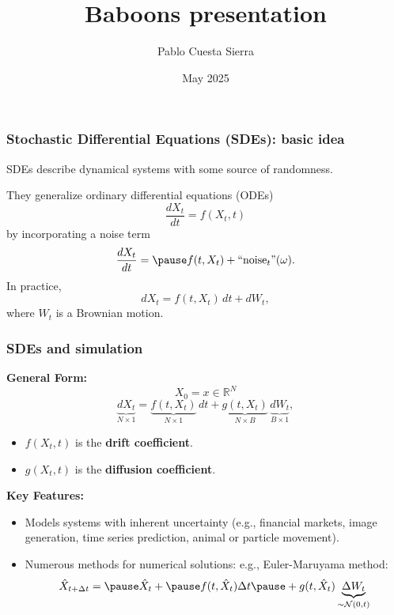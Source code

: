 \documentclass[
    aspectratio=169,
    10pt,
]{beamer}
\title{Baboons presentation}
\author{Pablo Cuesta Sierra}
\date{May 2025}
\begin{document}
\begin{frame}
\frametitle{Stochastic Differential Equations (SDEs): basic idea}


       SDEs describe dynamical systems with some source of randomness. \pause

       They generalize ordinary differential equations (ODEs)
        \[
           \frac{dX_t}{dt} = f(X_t, t)
        \]
        by incorporating a noise term 
        \[
           \frac{dX_t}{dt} = \pause f(t, X_t) + \text{``noise}_t\text{''}(\omega).
        \]
    \pause
        In practice,\[
            dX_t = f(t, X_t)\, dt + dW_t,
        \]
        where \(
            W_t
        \) is a Brownian motion.

\end{frame}

\begin{frame}
\frametitle{SDEs and simulation}

\vspace{0.7cm}

\textbf{General Form:} 
\[
    X_0 = x \in \mathbb{R}^N
\]
\[
    \underbrace{dX_t}_{N\times 1} = \underbrace{f(t, X_t)}_{N\times 1}\, dt + \underbrace{g(t, X_t)}_{N\times B}\, \underbrace{dW_t}_{B\times 1},
\]
\begin{itemize}
    \item \( f(X_t, t) \) is the \textbf{drift coefficient}.
    \item \( g(X_t, t) \) is the \textbf{diffusion coefficient}.
\end{itemize}
\pause
\bigskip
\textbf{Key Features:}
\begin{itemize}
    \item Models systems with inherent uncertainty (e.g., financial markets, image generation, time series prediction, animal or particle movement).
    \pause
    \item Numerous methods for numerical solutions: e.g., Euler-Maruyama method:\[
        \hat X_{t+\Delta t} = \pause \hat X_t + \pause f(t, \hat X_t)\Delta t  \pause + g(t, \hat X_t)\underbrace{\Delta W_t}_{\sim \mathcal N(0, t)}
    \]
\end{itemize}

\end{frame}
\end{document}
